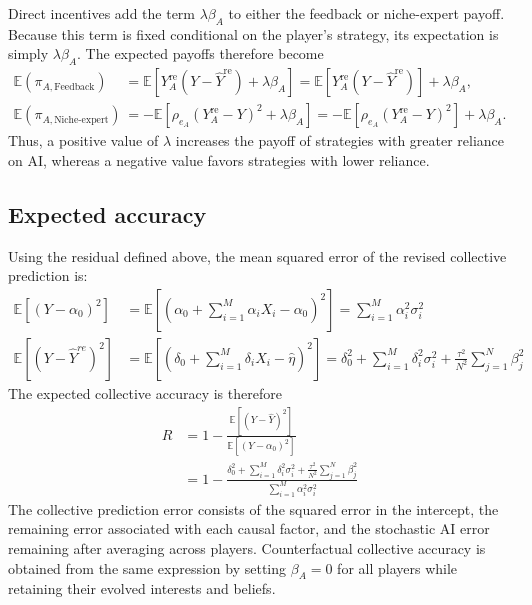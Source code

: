 \documentclass[12pt]{article}
\begin{document}
Direct incentives add the term $\lambda\beta_A$ to either the feedback or niche-expert payoff. 
Because this term is fixed conditional on the player's strategy, its expectation is simply $\lambda\beta_A$. 
The expected payoffs therefore become
\begin{align}
\mathbb{E}(\pi_{A, \textrm{Feedback}})&=\mathbb{E}\left[Y_A^{\mathrm{re}}(Y-\hat{Y}^{\mathrm{re}}) + \lambda\beta_A\right] = \mathbb{E}\left[Y_A^{\mathrm{re}}(Y-\hat{Y}^{\mathrm{re}})\right] + \lambda\beta_A,\\
\mathbb{E}(\pi_{A, \textrm{Niche-expert}}) &= -\mathbb{E}\left[\rho_{e_A}(Y_A^{\mathrm{re}}-Y)^2 + \lambda\beta_A\right] = -\mathbb{E}\left[\rho_{e_A}(Y_A^{\mathrm{re}}-Y)^2\right] + \lambda\beta_A.
\end{align}
Thus, a positive value of $\lambda$ increases the payoff of strategies with greater reliance on AI, whereas a negative value favors strategies with lower reliance.

\subsection{Expected accuracy}

Using the residual defined above, the mean squared error of the revised collective prediction is:
\begin{align}
\mathbb{E}[(Y - \alpha_0)^2] &= \mathbb{E}\left[\left(\alpha_0 +\sum_{i = 1}^{M}\alpha_iX_i - \alpha_0\right)^2\right] = \sum_{i = 1}^{M}\alpha_i^2\sigma_i^2\\
\mathbb{E}[(Y - \hat{Y}^{re})^2] &= \mathbb{E}\left[\left(\delta_0 +\sum_{i = 1}^{M}\delta_iX_i - \hat{\eta}\right)^2\right] = \delta_0^2 + \sum_{i = 1}^{M}\delta_i^2\sigma_i^2 + \frac{\tau^2}{N^2}\sum_{j = 1}^{N}\beta_j^2
\end{align}
The expected collective accuracy is therefore
\begin{align}
R
&= 1 - \frac{\mathbb{E}[(Y - \hat{Y})^2]}{\mathbb{E}[(Y - \alpha_0)^2]}\\[6pt]
&= 1- \frac{\delta_0^2 + \sum_{i = 1}^{M}\delta_i^2\sigma_i^2 + \frac{\tau^2}{N^2}\sum_{j = 1}^{N}\beta_j^2}{\sum_{i = 1}^{M}\alpha_i^2\sigma_i^2}
\end{align}
The collective prediction error consists of the squared error in the intercept, the remaining error associated with each causal factor, and the stochastic AI error remaining after averaging across players.
Counterfactual collective accuracy is obtained from the same expression by setting $\beta_A=0$ for all players while retaining their evolved interests and beliefs.
\end{document}
